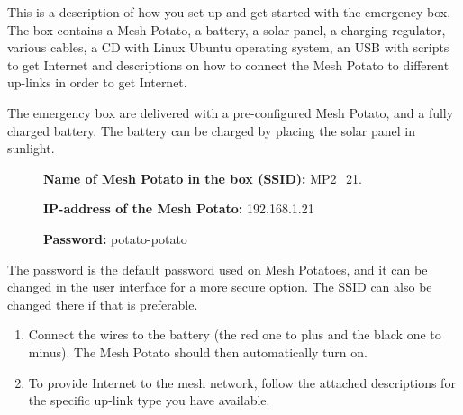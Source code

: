 This is a description of how you set up and get started with the emergency box. The box contains a Mesh Potato, a battery, a solar panel, a charging regulator, various cables, a CD with Linux Ubuntu operating system, an USB with scripts to get Internet and descriptions on how to connect the Mesh Potato to different up-links in order to get Internet. 

The emergency box are delivered with a pre-configured Mesh Potato, and a fully charged battery. The battery can be charged by placing the solar panel in sunlight. 

\begin{description}
\item[] \textbf{Name of Mesh Potato in the box (SSID):} MP2_21.
\item[] \textbf{IP-address of the Mesh Potato:} 192.168.1.21
\item[] \textbf{Password:} potato-potato 
\end{description}

The password is the default password used on Mesh Potatoes, and it can be changed in the user interface for a more secure option. The SSID can also be changed there if that is preferable. 

\begin{enumerate}
\item Connect the wires to the battery (the red one to plus and the black one to minus). The Mesh Potato should then automatically turn on. 
\item To provide Internet to the mesh network, follow the attached descriptions for the specific up-link type you have available. 
\end{enumerate} 